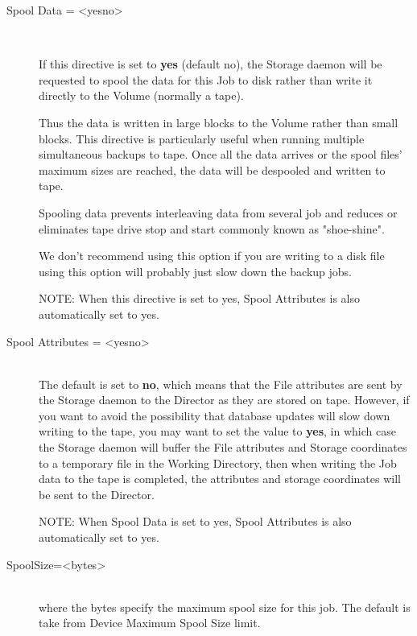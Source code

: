 \begin{description}
\item [Spool Data = {\textless}yes{\textbar}no{\textgreater}] \hfill \\

If this directive is set  to {\bf yes} (default no), the Storage daemon will
be requested  to spool the data for this Job to disk rather than write it
directly to the Volume (normally a tape).

Thus the data is written in large blocks to the Volume rather than small
blocks.  This directive is particularly useful when running multiple
simultaneous backups to tape.  Once all the data arrives or the spool
files' maximum sizes are reached, the data will be despooled and written
to tape.

Spooling data prevents interleaving data from several job and reduces or
eliminates tape drive stop and start commonly known as "shoe-shine".

We don't recommend using this option if you are writing to a disk file
using this option will probably just slow down the backup jobs.

NOTE: When this directive is set to yes, Spool Attributes is also
automatically set to yes.

\item [Spool Attributes = {\textless}yes{\textbar}no{\textgreater}] \hfill \\
The default is set to {\bf no}, which means that the File attributes are
sent by the Storage daemon to the Director as they are stored on tape.
However, if you want to avoid the possibility that database updates will
slow down writing to the tape, you may want to set the value to {\bf
yes}, in which case the Storage daemon will buffer the File attributes
and Storage coordinates to a temporary file in the Working Directory,
then when writing the Job data to the tape is completed, the attributes
and storage coordinates will be sent to the Director.

NOTE: When Spool Data is set to yes, Spool Attributes is also
automatically set to yes.

\item [SpoolSize={\textless}bytes{\textgreater}] \hfill \\
where the bytes specify the maximum spool size for this job.
The default is take from Device Maximum Spool Size limit.



\end{description}
